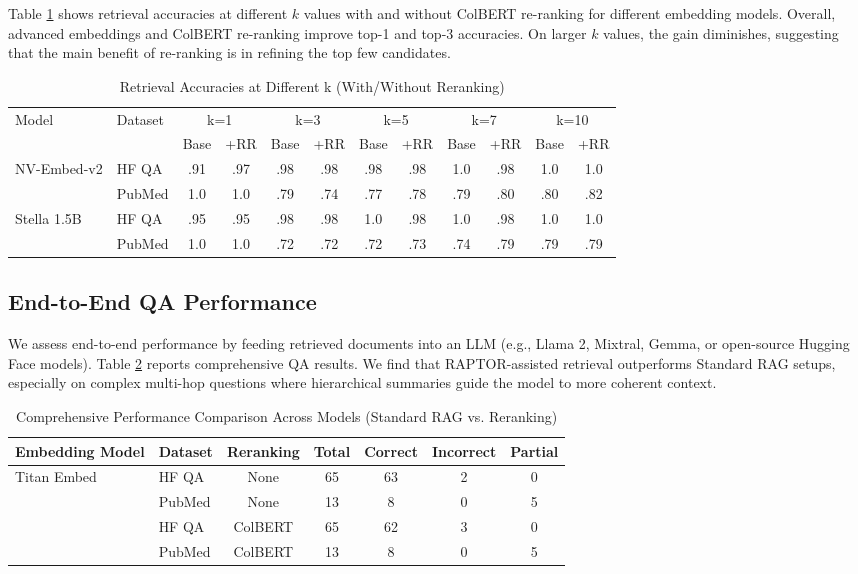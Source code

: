 \documentclass{scrartcl}
\begin{document}
Table \ref{tab:retrieval_accuracies} shows retrieval accuracies at different $k$ values with and without ColBERT re-ranking for different embedding models. Overall, advanced embeddings and ColBERT re-ranking improve top-1 and top-3 accuracies. On larger $k$ values, the gain diminishes, suggesting that the main benefit of re-ranking is in refining the top few candidates.

\begin{table}[h]
    \centering
    \caption{Retrieval Accuracies at Different k (With/Without Reranking)}
    \small
    \begin{tabular}{ll|cc|cc|cc|cc|cc}
    \hline
    \multirow{2}{*}{Model} & \multirow{2}{*}{Dataset} & \multicolumn{2}{c|}{k=1} & \multicolumn{2}{c|}{k=3} & \multicolumn{2}{c|}{k=5} & \multicolumn{2}{c|}{k=7} & \multicolumn{2}{c}{k=10} \\
    & & Base & +RR & Base & +RR & Base & +RR & Base & +RR & Base & +RR \\
    \hline
    NV-Embed-v2 & HF QA & .91 & .97 & .98 & .98 & .98 & .98 & 1.0 & .98 & 1.0 & 1.0 \\
    & PubMed & 1.0 & 1.0 & .79 & .74 & .77 & .78 & .79 & .80 & .80 & .82 \\
    \hline
    Stella 1.5B & HF QA & .95 & .95 & .98 & .98 & 1.0 & .98 & 1.0 & .98 & 1.0 & 1.0 \\
    & PubMed & 1.0 & 1.0 & .72 & .72 & .72 & .73 & .74 & .79 & .79 & .79 \\
    \hline
    \end{tabular}
    \label{tab:retrieval_accuracies}
\end{table}

\subsection{End-to-End QA Performance}

We assess end-to-end performance by feeding retrieved documents into an LLM (e.g., Llama 2, Mixtral, Gemma, or open-source Hugging Face models). Table \ref{tab:comprehensive_results} reports comprehensive QA results. We find that RAPTOR-assisted retrieval outperforms Standard RAG setups, especially on complex multi-hop questions where hierarchical summaries guide the model to more coherent context.

\begin{table}[h]
    \centering
    \caption{Comprehensive Performance Comparison Across Models (Standard RAG vs. Reranking)}
    \small
    \begin{tabular}{llccccc}
    \hline
    Embedding Model & Dataset & Reranking & Total & Correct & Incorrect & Partial \\
    \hline
    Titan Embed & HF QA & None & 65 & 63 & 2 & 0 \\
    & PubMed & None & 13 & 8 & 0 & 5 \\
    & HF QA & ColBERT & 65 & 62 & 3 & 0 \\
    & PubMed & ColBERT & 13 & 8 & 0 & 5 \\
    \hline
    \end{tabular}
    \label{tab:comprehensive_results}
\end{table}
\end{document}
